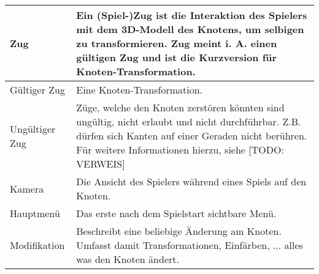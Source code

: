 \begin{longtable}{|p{}|p{}|}
\hline
Zug & Ein (Spiel-)Zug ist die Interaktion des Spielers mit dem 3D-Modell des Knotens, um selbigen zu transformieren. Zug meint i. A. einen gültigen Zug und ist die Kurzversion für Knoten-Transformation.\\
\hline
Gültiger Zug & Eine Knoten-Transformation.\\
\hline
Ungültiger Zug & Züge, welche den Knoten zerstören könnten sind ungültig, nicht erlaubt und nicht durchführbar. Z.B. dürfen sich Kanten auf einer Geraden nicht berühren. Für weitere Informationen hierzu, siehe {\color{red}[TODO: VERWEIS]}\\
\hline
Kamera & Die Ansicht des Spielers während eines Spiels auf den Knoten.\\
\hline
Hauptmenü & Das erste nach dem Spielstart sichtbare Menü.\\
\hline
Modifikation & Beschreibt eine beliebige Änderung am Knoten. Umfasst damit Transformationen, Einfärben, ... alles was den Knoten ändert.\\
\hline
\end{longtable}
